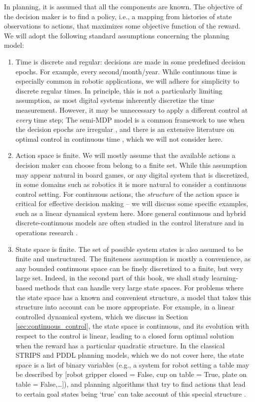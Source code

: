 In planning, it is assumed that all the components are known. The objective of the decision maker is to find a policy, i.e., a mapping from histories of state observations to actions, that maximizes some objective function of the reward. We will adopt the following standard assumptions concerning the planning model:
\begin{enumerate}
    \item Time is discrete and regular: decisions are made in some predefined decision epochs. For example, every second/month/year. While continuous time is especially common in robotic applications, we will adhere for simplicity to discrete regular times. In principle, this is not a particularly limiting assumption, as most digital systems inherently discretize the time measurement. However, it may be unnecessary to apply a different control at \textit{every} time step; The semi-MDP model is a common framework to use when the decision epochs are irregular \cite{puterman2014markov}, and there is an extensive literature on optimal control in continuous time \cite{kirk2004optimal}, which we will not consider here. 
    \item Action space is finite. We will mostly assume that the available actions a decision maker can choose from belong to a finite set. While this assumption may appear natural in board games, or any digital system that is discretized, in some domains such as robotics it is more natural to consider a continuous control setting.
    For continuous actions, the \textit{structure} of the action space is critical for effective decision making -- we will discuss some specific examples, such as a linear dynamical system here. More general continuous and hybrid discrete-continuous models are often studied in the control literature \cite{bemporad1999control} and in operations research \cite{powell2007approximate}.
    \item State space is finite. The set of possible system states is also assumed to be finite and unstructured. The finiteness assumption is mostly a convenience, as any bounded continuous space can be finely discretized to a finite, but very large set. Indeed, in the second part of this book, we shall study learning-based methods that can handle very large state spaces. For problems where the state space has a known and convenient structure, a model that takes this structure into account can be more appropriate. For example, in a linear controlled dynamical system, which we discuss in Section \ref{sec:continuous_control}, the state space is continuous, and its evolution with respect to the control is linear, leading to a closed form optimal solution when the reward has a particular quadratic structure. In the classical STRIPS and PDDL planning models, which we do not cover here, the state space is a list of binary variables (e.g., a system for robot setting a table may be described by [robot gripper closed = False, cup on table = True, plate on table = False,\dots]), and planning algorithms that try to find actions that lead to certain goal states being `true' can take account of this special structure \cite{russell2016artificial}. 

\end{enumerate}
